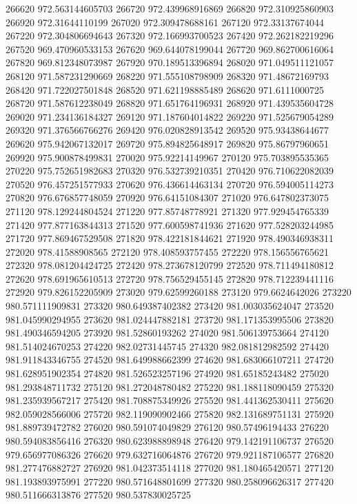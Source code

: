 {266620 972.563144605703
266720 972.439968916869
266820 972.310925860903
266920 972.31644110199
267020 972.309478688161
267120 972.33137674044
267220 972.304806694643
267320 972.166993700523
267420 972.262182219296
267520 969.470960533153
267620 969.644078199044
267720 969.862700616064
267820 969.812348073987
267920 970.189513396894
268020 971.049511121057
268120 971.587231290669
268220 971.555108798909
268320 971.48672169793
268420 971.722027501848
268520 971.621198885489
268620 971.6111000725
268720 971.587612238049
268820 971.651764196931
268920 971.439535604728
269020 971.234136184327
269120 971.187604014822
269220 971.525679054289
269320 971.376566766276
269420 976.020828913542
269520 975.93438644677
269620 975.942067132017
269720 975.894825648917
269820 975.86797960651
269920 975.900878499831
270020 975.92214149967
270120 975.703895535365
270220 975.752651982683
270320 976.532739210351
270420 976.710622082039
270520 976.457251577933
270620 976.436614463134
270720 976.594005114273
270820 976.676857748059
270920 976.64151084307
271020 976.647802373075
271120 978.129244804524
271220 977.85748778921
271320 977.929454765339
271420 977.877163844313
271520 977.600598741936
271620 977.528203244985
271720 977.869467529508
271820 978.422181844621
271920 978.490346938311
272020 978.41588908565
272120 978.408593757455
272220 978.156556765621
272320 978.081204424725
272420 978.273678120799
272520 978.711494180812
272620 978.691965610513
272720 978.756529455145
272820 978.712239441116
272920 979.826152205909
273020 979.62599260188
273120 979.6624642026
273220 980.571111909831
273320 980.649387402382
273420 981.003035624047
273520 981.045990294955
273620 981.024447882181
273720 981.171353995506
273820 981.490346594205
273920 981.52860193262
274020 981.506139753664
274120 981.514024670253
274220 982.02731445745
274320 982.081812982592
274420 981.911843346755
274520 981.649988662399
274620 981.683066107211
274720 981.628951902354
274820 981.526523257196
274920 981.65185243482
275020 981.293848711732
275120 981.272048780482
275220 981.188118090459
275320 981.235939567217
275420 981.708875349926
275520 981.441362530411
275620 982.059028566006
275720 982.119090902466
275820 982.131689751131
275920 981.889739472782
276020 980.591074049829
276120 980.57496194433
276220 980.594083856416
276320 980.623988898948
276420 979.142191106737
276520 979.656977086326
276620 979.632716064876
276720 979.921187106577
276820 981.277476882727
276920 981.042373514118
277020 981.180465420571
277120 981.193893975991
277220 980.571648801699
277320 980.258096626317
277420 980.511666313876
277520 980.537830025725
}
